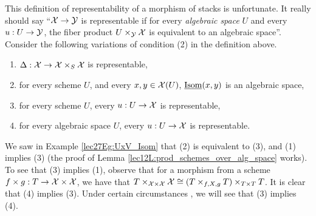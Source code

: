  \begin{remark}\label{lec27R:yucky_def}
   This definition of representability of a morphism of stacks is unfortunate. It really
   should say ``$\mathcal{X}\to \mathcal{Y}$ is representable if for every \emph{algebraic space} $U$ and
   every $u:U\to \mathcal{Y}$, the fiber product $U\times_{\mathcal{Y}} \mathcal{X}$ is equivalent to an algebraic
   space''. Consider the following variations of condition (2) in the definition above.
   \begin{enumerate}
     \item $\Delta:\mathcal{X}\to \mathcal{X}\times_S \mathcal{X}$ is representable,
     \item for every scheme $U$, and every $x,y\in\mathcal{X}(U)$, $\operatorname{\underline{Isom}}(x,y)$ is an algebraic space,
     \item for every scheme $U$, every $u:U\to \mathcal{X}$ is representable,
     \item for every algebraic space $U$, every $u:U\to \mathcal{X}$ is representable.
   \end{enumerate}
   We saw in Example \ref{lec27Eg:UxV_Isom} that (2) is equivalent to (3),
   and (1) implies (3) (the proof of Lemma \ref{lec12L:prod_schemes_over_alg_space}
   works). To see that (3) implies (1), observe that for a morphism from a scheme
   $f\times g:T\to \mathcal{X}\times \mathcal{X}$, we have that $T\times_{\mathcal{X}\times \mathcal{X}}\mathcal{X} \cong
   (T\times_{f,X,g} T)\times_{T\times T} T$. It is clear that (4) implies (3). Under
   certain circumstances , we will see that (3) implies (4).
 \end{remark}
%
